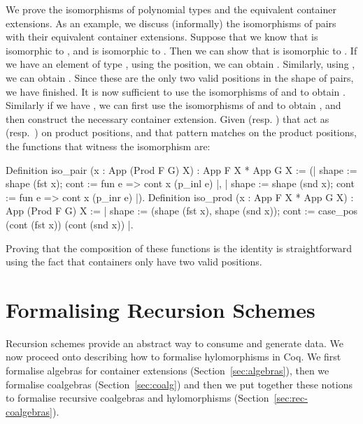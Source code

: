 \documentclass[ a4paper, UKenglish, cleveref, autoref, thm-restate]{lipics-v2021}
\begin{document}
We prove the isomorphisms of polynomial types and the equivalent 
container extensions. As an example, we discuss (informally) the isomorphisms
of pairs with their equivalent container extensions. Suppose that we
know that  is isomorphic to , and
 is isomorphic to . Then we can
show that  is isomorphic to
.  If we have an element of type 
,
using the  position, we can obtain
.  Similarly, using , we can
obtain . Since these are the only two valid positions
in the shape of pairs, we have finished. It is now sufficient to use the
isomorphisms of  and  to
obtain . Similarly if we have ,
we can first use the isomorphisms of 
 and
 to obtain
, and then construct the necessary container
extension. Given  (resp. ) that
act as  (resp.\ ) on product positions, and
 that pattern
matches on the product positions, the functions that witness the isomorphism
are:
\begin{coqcode}
Definition iso_pair (x : App (Prod F G) X) : App F X * App G X :=
  ({| shape := shape (fst x); cont := fun e => cont x (p_inl e) |}, 
   {| shape := shape (snd x); cont := fun e => cont x (p_inr e) |}).
Definition iso_prod (x : App F X * App G X) : App (Prod F G) X :=
{| shape := (shape (fst x), shape (snd x));
   cont := case_pos (cont (fst x)) (cont (snd x)) |}.
\end{coqcode}
Proving that the composition of these functions is the identity is
straightforward using the fact that  containers only have two valid
positions.

\section{Formalising Recursion Schemes}
\label{sec:recursion-schemes}
Recursion schemes provide an abstract way to consume and generate data. We now
proceed onto describing how to formalise hylomorphisms in Coq. We first
formalise algebras for container extensions (Section~\ref{sec:algebras}), then
we formalise coalgebras (Section~\ref{sec:coalg}) and then we put together
these notions to formalise recursive coalgebras and hylomorphisms
(Section~\ref{sec:rec-coalgebras}).
\end{document}

